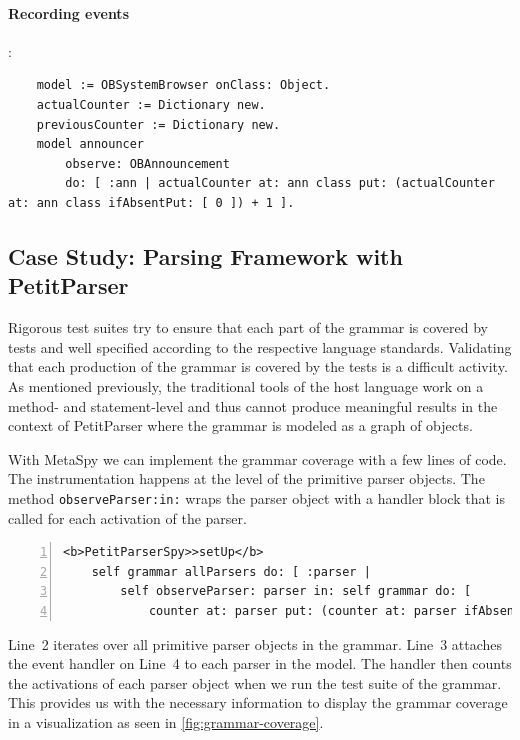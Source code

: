 \documentclass[runningheads]{llncs}
\newcommand{\project}{{\sc MetaSpy}\xspace}
\newcommand{\ct}{\lstinline[backgroundcolor=\color{white},basicstyle=\footnotesize\ttfamily]}
\begin{document}
\paragraph{Recording events}:
\begin{lstlisting}
	model := OBSystemBrowser onClass: Object.
	actualCounter := Dictionary new.
	previousCounter := Dictionary new.
	model announcer
		observe: OBAnnouncement
		do: [ :ann | actualCounter at: ann class put: (actualCounter at: ann class ifAbsentPut: [ 0 ]) + 1 ].
\end{lstlisting}


\subsection{Case Study: Parsing Framework with PetitParser}


Rigorous test suites try to ensure that each part of the grammar is covered by tests and well specified according to the respective language standards. Validating that each production of the grammar is covered by the tests is a difficult activity. As mentioned previously, the traditional tools of the host language work on a method- and statement-level and thus cannot produce meaningful results in the context of PetitParser where the grammar is modeled as a graph of objects.

With \project we can implement the grammar coverage with a few lines of code. The instrumentation happens at the level of the primitive parser objects. The method \ct{observeParser:in:} wraps the parser object with a handler block that is called for each activation of the parser.

\begin{lstlisting}[numbers=left]
<b>PetitParserSpy>>setUp</b>
	self grammar allParsers do: [ :parser |
		self observeParser: parser in: self grammar do: [
			counter at: parser put: (counter at: parser ifAbsent: [ 0 ]) + 1 ] ]
\end{lstlisting}

Line~2 iterates over all primitive parser objects in the grammar. Line~3 attaches the event handler on Line~4 to each parser in the model. The handler then counts the activations of each parser object when we run the test suite of the grammar. This provides us with the necessary information to display the grammar coverage in a visualization as seen in \autoref{fig:grammar-coverage}.
\end{document}
